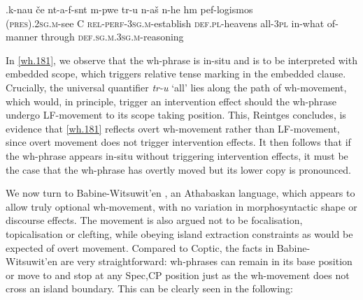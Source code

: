 \documentclass[charis]{glossa}
\begin{document}
\exg.\label{wh.181}k-nau \v{c}e {\textschwa}nt-a-f-s{\textschwa}nt {\textschwa}m-p{\textepsilon}we t{\textepsilon}r-u {\textschwa}n-a\v{s} {\textschwa}n-he h{\textschwa}m pef-logismos\\
   \textsc{(pres).2sg.m}-see C \textsc{rel-perf-3sg.m}-establish \textsc{def.pl}-heavens all-\textsc{3pl} in-what of-manner through \textsc{def.sg.m.3sg.m}-reasoning\\

In \ref{wh.181}, we observe that the wh-phrase is in-situ and is to be interpreted with embedded scope, which triggers relative tense marking in the embedded clause. Crucially, the universal quantifier \textit{t\textepsilon r-u} `all' lies along the path of wh-movement, which would, in principle, trigger an intervention effect should the wh-phrase undergo LF-movement to its scope taking position. This, Reintges concludes, is evidence that \ref{wh.181} reflects overt wh-movement rather than LF-movement, since overt movement does not trigger intervention effects. It then follows that if the wh-phrase appears in-situ without triggering intervention effects, it must be the case that the wh-phrase has overtly moved but its lower copy is pronounced.
%
%

We now turn to Babine-Witsuwit'en \citep{denham:1997,denham:2000}, an Athabaskan language, which appears to allow truly optional wh-movement, with no variation in morphosyntactic shape or discourse effects. The movement is also argued not to be focalisation, topicalisation or clefting, while obeying island extraction constraints as would be expected of overt movement. Compared to Coptic, the facts in Babine-Witsuwit'en are very straightforward: wh-phrases can remain in its base position or move to and stop at any Spec,CP position just as the wh-movement does not cross an island boundary. This can be clearly seen in the following:
\end{document}
